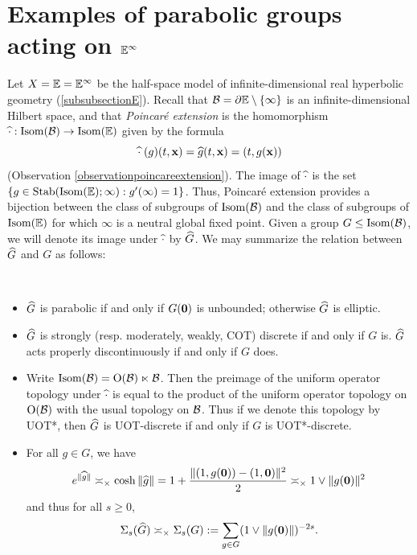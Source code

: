 \section{Examples of parabolic groups acting on $\E^\infty$}
\label{subsectionparabolic}
Let $X = \E = \E^\infty$ be the half-space model of infinite-dimensional real hyperbolic geometry (\6\ref{subsubsectionE}). Recall that $\BB = \del \E\butnot\{\infty\}$ is an infinite-dimensional Hilbert space, and that \emph{Poincar\'e extension} is the homomorphism $\what\cdot:\Isom(\BB) \to \Isom(\E)$ given by the formula
\[
\widehat\cdot \;(g)(t,\mathbf x) = \widehat g(t,\mathbf x) = (t,g(\mathbf x))
\]
(Observation \ref{observationpoincareextension}). The image of $\widehat\cdot$ is the set $\{g\in\Stab(\Isom(\E);\infty) : g'(\infty) = 1\}$. Thus, Poincar\'e extension provides a bijection between the class of subgroups of $\operatorname{Isom}(\mathcal B)$ and the class of subgroups of $\Isom(\E)$ for which $\infty$ is a neutral global fixed point. Given a group $G\leq\operatorname{Isom}(\mathcal B)$, we will denote its image under $\widehat\cdot$ by $\widehat G$. We may summarize the relation between $\widehat G$ and $G$ as follows:

\begin{observation}
\label{observationisomE}
~
\begin{itemize}
\item[(i)] $\widehat G$ is parabolic if and only if $G(\mathbf 0)$ is unbounded; otherwise $\widehat G$ is elliptic.
\item[(ii)] $\widehat G$ is strongly (resp. moderately, weakly, COT) discrete if and only if $G$ is. $\widehat G$ acts properly discontinuously if and only if $G$ does.
\item[(iii)] Write $\operatorname{Isom}(\mathcal B) = \operatorname{O}(\mathcal B)\ltimes \mathcal B$. Then the preimage of the uniform operator topology under $\widehat\cdot$ is equal to the product of the uniform operator topology on $\operatorname{O}(\mathcal B)$ with the usual topology on $\mathcal B$. Thus if we denote this topology by UOT*, then $\widehat G$ is UOT-discrete if and only if $G$ is UOT*-discrete.
\item[(iv)]
For all $g\in G$, we have
\[
e^{\|\widehat g\|} \asymp_\times \cosh\|\widehat g\| = 1 + \frac{\|(1,g(\mathbf 0)) - (1,\mathbf 0)\|^2}{2} \asymp_\times 1 \vee \|g(\mathbf 0)\|^2
\]
and thus for all $s\geq 0$,
\begin{equation}
\label{poincareextensionpoincareexponent}
\Sigma_s(\widehat G) \asymp_\times \Sigma_s(G) := \sum_{g\in G} (1\vee \|g(\mathbf 0)\|)^{-2s}.
\end{equation}
\end{itemize}
\end{observation}

